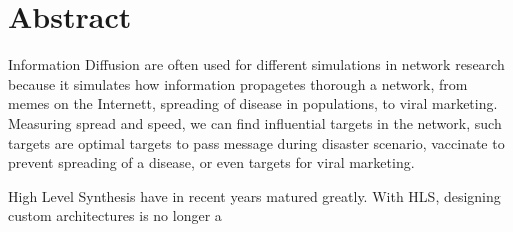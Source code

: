 \section*{Abstract}


Information Diffusion are often used for different simulations in network research because it simulates how information propagetes thorough a network, from memes on the Internett, spreading of disease in populations, to viral marketing. Measuring spread and speed, we can find influential targets in the network, such targets are optimal targets to pass message during disaster scenario, vaccinate to prevent spreading of a disease, or even targets for viral marketing. 


High Level Synthesis have in recent years matured greatly. With HLS, designing custom architectures  is no longer a 